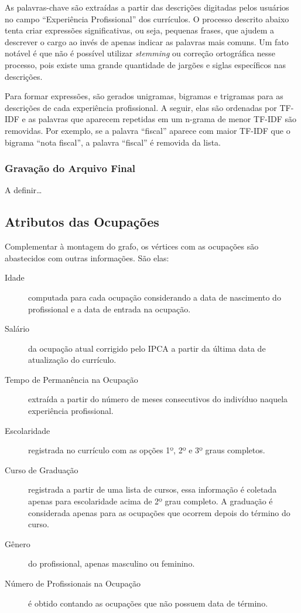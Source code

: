 \documentclass[12pt,a4paper]{article}
\theoremstyle{hypo}
\begin{document}
As palavras-chave são extraídas a partir das descrições digitadas pelos usuários no campo \enquote{Experiência Profissional} dos currículos. O processo descrito abaixo tenta criar expressões significativas, ou seja, pequenas frases, que ajudem a descrever o cargo ao invés de apenas indicar as palavras mais comuns. Um fato notável é que não é possível utilizar \textit{stemming} ou correção ortográfica nesse processo, pois existe uma grande quantidade de jargões e siglas específicos nas descrições.

Para formar expressões, são gerados unigramas, bigramas e trigramas para as descrições de cada experiência profissional. A seguir, elas são ordenadas por TF-IDF e as palavras que aparecem repetidas em um n-grama de menor TF-IDF são removidas. Por exemplo, se a palavra \enquote{fiscal} aparece com maior TF-IDF que o bigrama \enquote{nota fiscal}, a palavra \enquote{fiscal} é removida da lista.


\subsubsection{Gravação do Arquivo Final}

A definir\ldots

\subsection{Atributos das Ocupações}

Complementar à montagem do grafo, os vértices com as ocupações são abastecidos com outras informações. São elas:

\begin{description}
  \item[Idade] computada para cada ocupação considerando a data de nascimento do profissional e a data de entrada na ocupação.
  \item[Salário] da ocupação atual corrigido pelo IPCA a partir da última data de atualização do currículo.
  \item[Tempo de Permanência na Ocupação] extraída a partir do número de meses consecutivos do indivíduo naquela experiência profissional.
  \item[Escolaridade] registrada no currículo com as opções 1º, 2º e 3º graus completos.
  \item[Curso de Graduação] registrada a partir de uma lista de cursos, essa informação é coletada apenas para escolaridade acima de 2º grau completo. A graduação é considerada apenas para as ocupações que ocorrem depois do término do curso.
  \item[Gênero] do profissional, apenas masculino ou feminino.
  \item[Número de Profissionais na Ocupação] é obtido contando as ocupações que não possuem data de término.
\end{description}
\end{document}
